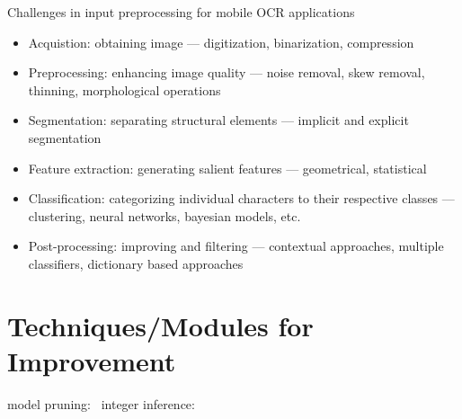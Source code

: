 Challenges in input preprocessing for mobile OCR applications~\cite{sourvanos_challenges_2018}
\begin{itemize}
    \item Acquistion: obtaining image --- digitization, binarization, compression
    \item Preprocessing: enhancing image quality --- noise removal, skew removal, thinning,
        morphological operations
    \item Segmentation: separating structural elements --- implicit and explicit segmentation
    \item Feature extraction: generating salient features --- geometrical, statistical
    \item Classification: categorizing individual characters to their respective classes --- clustering,
        neural networks, bayesian models, etc.
    \item Post-processing: improving and filtering --- contextual approaches, multiple classifiers,
        dictionary based approaches
\end{itemize}


\section{Techniques/Modules for Improvement}

model pruning:~\cite{niu_26ms_2019}
integer inference:~\cite{ignatov_ai_2019}

